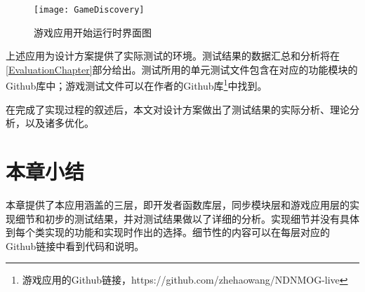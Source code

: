 \begin{figure}[h!]
	\centering
	\texttt{[image: GameDiscovery]}
	\caption{游戏应用开始运行时界面图}
	\label{fig:ApplicationDiscovering}
\end{figure}
\par
上述应用为设计方案提供了实际测试的环境。测试结果的数据汇总和分析将在\ref{EvaluationChapter}部分给出。测试所用的单元测试文件包含在对应的功能模块的Github库中；游戏测试文件可以在作者的Github库\footnote{游戏应用的Github链接，https://github.com/zhehaowang/NDNMOG-live}中找到。
\par
在完成了实现过程的叙述后，本文对设计方案做出了测试结果的实际分析、理论分析，以及诸多优化。
\section{本章小结}
本章提供了本应用涵盖的三层，即开发者函数库层，同步模块层和游戏应用层的实现细节和初步的测试结果，并对测试结果做以了详细的分析。实现细节并没有具体到每个类实现的功能和实现时作出的选择。细节性的内容可以在每层对应的Github链接中看到代码和说明。